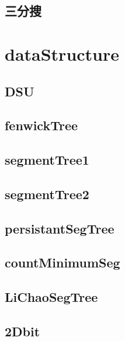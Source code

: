 \documentclass[a4paper,10pt,twocolumn,oneside]{article}
\begin{document}
    \subsection{三分搜}
    

\section{dataStructure}
    \subsection{DSU}
    

    \subsection{fenwickTree}
    

    \subsection{segmentTree1}
    

    \subsection{segmentTree2}
    
    
    \subsection{persistantSegTree}
    
    
    \subsection{countMinimumSeg} 
    

    \subsection{LiChaoSegTree}
    

    \subsection{2Dbit}
    
\end{document}
